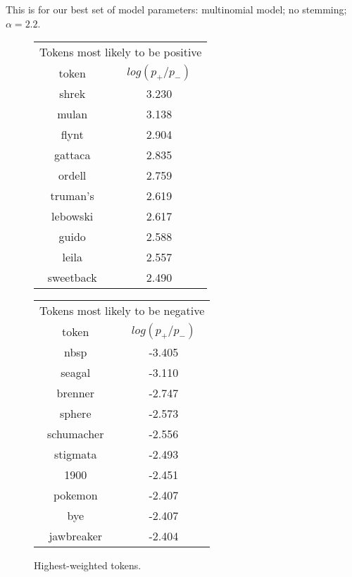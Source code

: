 \documentclass{article}
\begin{document}
This is for our best set of model parameters: multinomial model; no stemming; \(\alpha=2.2\).

\begin{figure}
\begin{tabular}{c|c}
    \multicolumn{2}{c}{Tokens most likely to be positive} \\
    token & \(log(p_+ / p_-)\) \\
    \hline
    shrek & 3.230 \\
    mulan & 3.138 \\
    flynt & 2.904 \\
    gattaca & 2.835 \\
    ordell & 2.759 \\
    truman's & 2.619 \\
    lebowski & 2.617 \\
    guido & 2.588 \\
    leila & 2.557 \\
    sweetback & 2.490
\end{tabular}
\begin{tabular}{c|c}
    \multicolumn{2}{c}{Tokens most likely to be negative} \\
    token & \(log(p_+ / p_-)\) \\
    \hline
    nbsp & -3.405 \\
    seagal & -3.110 \\
    brenner & -2.747 \\
    sphere & -2.573 \\
    schumacher & -2.556 \\
    stigmata & -2.493 \\
    1900 & -2.451 \\
    pokemon & -2.407 \\
    bye & -2.407 \\
    jawbreaker & -2.404
\end{tabular}
\caption{Highest-weighted tokens.}
\end{figure}
\end{document}
